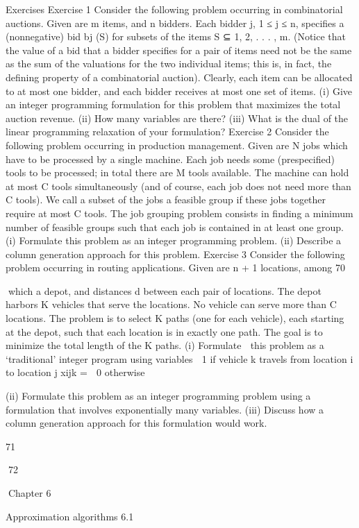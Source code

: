 \documentclass[titlepage]{book}
\theoremstyle{plain}
\theoremstyle{definition}
\theoremstyle{remark}
\begin{document}
Exercises
Exercise 1
Consider the following problem occurring in combinatorial auctions. Given are m items, and n bidders.
Each bidder j, 1 ≤ j ≤ n, specifies a (nonnegative) bid bj (S) for subsets of the items S ⊆ {1, 2, . . . , m}.
(Notice that the value of a bid that a bidder specifies for a pair of items need not be the same as the sum
of the valuations for the two individual items; this is, in fact, the defining property of a combinatorial
auction). Clearly, each item can be allocated to at most one bidder, and each bidder receives at most
one set of items.
(i) Give an integer programming formulation for this problem that maximizes the total auction revenue.
(ii) How many variables are there?
(iii) What is the dual of the linear programming relaxation of your formulation?
Exercise 2
Consider the following problem occurring in production management. Given are N jobs which have to be
processed by a single machine. Each job needs some (prespecified) tools to be processed; in total there
are M tools available. The machine can hold at most C tools simultaneously (and of course, each job
does not need more than C tools). We call a subset of the jobs a feasible group if these jobs together
require at most C tools. The job grouping problem consists in finding a minimum number of feasible
groups such that each job is contained in at least one group.
(i) Formulate this problem as an integer programming problem.
(ii) Describe a column generation approach for this problem.
Exercise 3
Consider the following problem occurring in routing applications. Given are n + 1 locations, among
70

which a depot, and distances d between each pair of locations. The depot harbors K vehicles that serve
the locations. No vehicle can serve more than C locations. The problem is to select K paths (one for
each vehicle), each starting at the depot, such that each location is in exactly one path. The goal is to
minimize the total length of the K paths.
(i) Formulate
 this problem as a ‘traditional' integer program using variables
 1 if vehicle k travels from location i to location j
xijk =
 0 otherwise

(ii) Formulate this problem as an integer programming problem using a formulation that involves
exponentially many variables.
(iii) Discuss how a column generation approach for this formulation would work.

71

72

Chapter 6

Approximation algorithms
6.1
\end{document}

